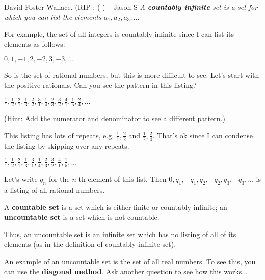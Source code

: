 David Foster Wallace. (RIP :-( ) – Jason S
\em
\es
\bs
A \textbf{countably infinite} set is a set for which you can list
the elements $a_1,a_2,a_3,...$

For example, the set of all integers is countably infinite since I
can list its elements as follows: 

$0,1,-1,2,-2,3,-3,...$ 

So is the set of rational numbers, but this is more difficult to see.
Let's start with the positive rationals. Can you see the pattern in
this listing?

$\frac{1}{1},\frac{1}{2},\frac{2}{1},\frac{1}{3},\frac{2}{2},\frac{3}{1},\frac{1}{4},\frac{2}{3},\frac{3}{2},\frac{4}{1},\frac{1}{5},\frac{2}{4},...$

(Hint: Add the numerator and denominator to see a different pattern.) 

This listing has lots of repeats, e.g. $\frac{1}{1}, \frac{2}{2}$
and $\frac{1}{2}, \frac{2}{4}$. That's ok since I can condense the
listing by skipping over any repeats.

$\frac{1}{1},\frac{1}{2},\frac{2}{1},\frac{1}{3},\frac{3}{1},\frac{1}{4},\frac{2}{3},\frac{3}{2},\frac{4}{1},\frac{1}{5},...$

Let's write $q_n$ for the $n$-th element of this list. Then $0,q_1,-q_1,q_2,-q_2,q_3,-q_3,...$
is a listing of all rational numbers.

A \textbf{countable set} is a set which is either finite or countably
infinite; an \textbf{uncountable set} is a set which is not countable.

Thus, an uncountable set is an infinite set which has no listing of
all of its elements (as in the definition of countably infinite set).

An example of an uncountable set is the set of all real numbers. To
see this, you can use the \textbf{diagonal method}. Ask another question
to see how this works...
\es
\eqq

